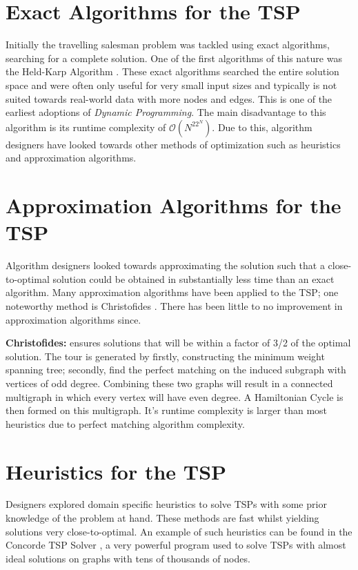 \documentclass[]{UCD_CS_FYP_Report}
\begin{document}
\section{Exact Algorithms for the TSP}
Initially the travelling salesman problem was tackled using exact algorithms, searching for a complete solution. One of the first algorithms of this nature was the Held-Karp Algorithm \cite{Bellman:1962:DPT:321105.321111}. These exact algorithms searched the entire solution space and were often only useful for very small input sizes and typically is not suited towards real-world data with more nodes and edges. This is one of the earliest adoptions of \textit{Dynamic Programming}. The main disadvantage to this algorithm is its runtime complexity of $\mathcal{O}(N^22^N)$. Due to this, algorithm designers have looked towards other methods of optimization such as heuristics and approximation algorithms.

\section{Approximation Algorithms for the TSP}
Algorithm designers looked towards approximating the solution such that a close-to-optimal solution could be obtained in substantially less time than an exact algorithm. Many approximation algorithms have been applied to the TSP; one noteworthy method is Christofides \cite{JohnMcGe97}. There has been little to no improvement in approximation algorithms since. 

\textbf{Christofides:} ensures solutions that will be within a factor of 3/2 of the optimal solution. The tour is generated by firstly, constructing the minimum weight spanning tree; secondly, find the perfect matching on the induced subgraph with vertices of odd degree. Combining these two graphs will result in a connected multigraph in which every vertex will have even degree. A Hamiltonian Cycle is then formed on this multigraph. It's runtime complexity is larger than most heuristics due to perfect matching algorithm complexity.

\section{Heuristics for the TSP}
Designers explored domain specific heuristics to solve TSPs with some prior knowledge of the problem at hand. These methods are fast whilst yielding solutions very close-to-optimal. An example of such heuristics can be found in the Concorde TSP Solver \cite{davidapplegate2007}, a very powerful program used to solve TSPs with almost ideal solutions on graphs with tens of thousands of nodes.
\end{document}
